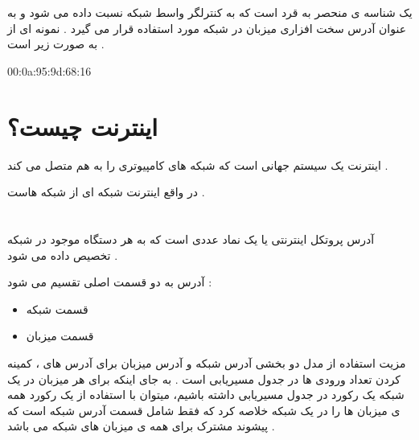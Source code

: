 \documentclass[12pt]{book}
\begin{document}
\section{}

یک شناسه ی منحصر به قرد است که به کنترلگر واسط شبکه نسبت داده می شود و به عنوان آدرس سخت افزاری میزبان در شبکه مورد استفاده قرار می گیرد . نمونه ای از 
به صورت زیر است .
\begin{latin}
\begin{tcolorbox}
\begin{center}
00:0a:95:9d:68:16
\end{center}
\end{tcolorbox}
\end{latin}

\section{اینترنت چیست؟}

اینترنت یک سیستم جهانی است که  شبکه های کامپیوتری را به هم متصل می کند .

در واقع اینترنت شبکه ای از شبکه هاست .

 
\section{}

آدرس پروتکل اینترنتی یا
یک نماد عددی است که به هر دستگاه موجود در شبکه تخصیص داده می شود .

آدرس
به دو قسمت اصلی تقسیم می شود :
\begin{itemize}
	\item قسمت شبکه
	\item قسمت میزبان
\end{itemize}


\begin{center}
\end{center}

مزیت استفاده از مدل دو بخشی آدرس شبکه و آدرس میزبان برای آدرس های
	، کمینه کردن تعداد ورودی ها در جدول مسیریابی است .
	به جای اینکه برای هر میزبان در یک شبکه یک رکورد در جدول مسیریابی داشته باشیم، میتوان با استفاده از یک رکورد همه ی میزبان ها را در یک شبکه خلاصه کرد که فقط شامل قسمت آدرس شبکه است که پیشوند مشترک برای همه ی میزبان های شبکه می باشد .
\end{document}
